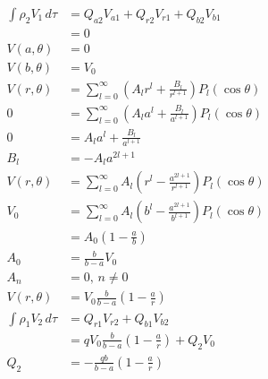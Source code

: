 \documentclass{article}
\begin{document}
\begin{enumerate}
        \begin{align*}
          \int \rho_2 V_1 \,d \tau & = Q_{a 2} V_{a 1} + Q_{r 2} V_{r 1} + Q_{b 2} V_{b 1}                                          \\
                                   & = 0                                                                                            \\
          V(a, \theta)             & = 0                                                                                            \\
          V(b, \theta)             & = V_0                                                                                          \\
          V(r, \theta)             & = \sum_{l = 0}^\infty \left( A_l r^l + \frac{B_l}{r^{l + 1}} \right) P_l (\cos \theta)         \\
          0                        & = \sum_{l = 0}^\infty \left( A_l a^l + \frac{B_l}{a^{l + 1}} \right) P_l (\cos \theta)         \\
          0                        & = A_l a^l + \frac{B_l}{a^{l + 1}}                                                              \\
          B_l                      & = -A_l a^{2 l + 1}                                                                             \\
          V(r, \theta)             & = \sum_{l = 0}^\infty A_l \left( r^l - \frac{a^{2 l + 1}}{r^{l + 1}} \right) P_l (\cos \theta) \\
          V_0                      & = \sum_{l = 0}^\infty A_l \left( b^l - \frac{a^{2 l + 1}}{b^{l + 1}} \right) P_l (\cos \theta) \\
                                   & = A_0 \left( 1 - \frac{a}{b} \right)                                                           \\
          A_0                      & = \frac{b}{b - a} V_0                                                                          \\
          A_n                      & = 0, \,n \ne 0                                                                                 \\
          V(r, \theta)             & = V_0 \frac{b}{b - a} \left( 1 - \frac{a}{r} \right)                                           \\
          \int \rho_1 V_2 \,d \tau & = Q_{r 1} V_{r 2} + Q_{b 1} V_{b 2}                                                            \\
                                   & = q V_0 \frac{b}{b - a} \left( 1 - \frac{a}{r} \right) + Q_2 V_0                               \\
          Q_2                      & = -\frac{q b}{b - a} \left( 1 - \frac{a}{r} \right)
        \end{align*}


\end{enumerate}
\end{document}

